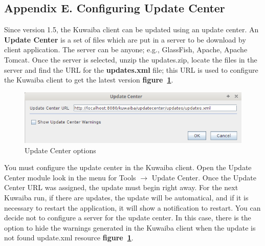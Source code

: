 \documentclass[a4paper]{article}
\begin{document}
\begin{appendices}
			\section{Appendix E. Configuring Update Center} \label{app:AppendixE}
			Since version 1.5, the Kuwaiba client can be updated using an update center. An \textbf{Update Center} is a set of files which are put in a server to be download by client application. The server can be anyone; e.g., GlassFish, Apache, Apache Tomcat. Once the server is selected, unzip the updates.zip, locate the files in the server and find the URL for the \textbf{updates.xml} file; this URL is used to configure the Kuwaiba client to get the latest version \textbf{figure~\ref{fig:update_center_options}}.
			
			\begin{figure}[h!]
				\centering
				\includegraphics[width=0.7\linewidth]{img/update_center.png}
				\caption{Update Center options}
				\label{fig:update_center_options}
			\end{figure}
						
			 You must configure the update center in the Kuwaiba client. Open the Update Center module look in the menu for Tools $\rightarrow$ Update Center. Once the Update Center URL was assigned, the update must begin right away. For the next Kuwaiba run, if there are updates, the update will be automatical, and if it is necessary to restart the application, it will show a notification to restart.
			\newline
			\newline
			You can decide not to configure a server for the update center. In this case, there is the option to hide the warnings generated in the Kuwaiba client when the update is not found update.xml resource  \textbf{figure~\ref{fig:update_center_options}}.					
			
		\end{appendices}			
\end{document}
